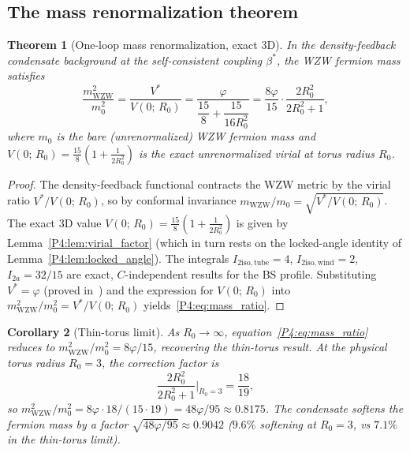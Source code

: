 \documentclass[11pt,a4paper]{article}
\newtheorem{theorem}{Theorem}[section]
\newtheorem{corollary}[theorem]{Corollary}
\theoremstyle{definition}
\theoremstyle{remark}
\newcommand{\vp}{\varphi}
\newcommand{\bst}{\beta^{*}}
\newcommand{\mWZW}{m_{\mathrm{WZW}}}
\begin{document}
\subsection{The mass renormalization theorem}

\begin{theorem}[One-loop mass renormalization, exact 3D]
\label{P4:thm:mass_renorm}
In the density-feedback condensate background at the self-consistent
coupling $\bst$, the WZW fermion mass satisfies
\begin{equation}
  \frac{\mWZW^2}{m_0^2}
  = \frac{V^*}{V(0;\,R_0)}
  = \frac{\vp}{\dfrac{15}{8}+\dfrac{15}{16R_0^2}}
  = \frac{8\vp}{15}\cdot\frac{2R_0^2}{2R_0^2+1},
  \label{P4:eq:mass_ratio}
\end{equation}
where $m_0$ is the bare (unrenormalized) WZW fermion mass and
$V(0;\,R_0) = \tfrac{15}{8}(1 + \tfrac{1}{2R_0^2})$
is the exact unrenormalized virial at torus radius $R_0$.
\end{theorem}

\begin{proof}
The density-feedback functional contracts the WZW metric by the virial ratio
$V^*/V(0;\,R_0)$, so by conformal invariance $\mWZW/m_0 = \sqrt{V^*/V(0;\,R_0)}$.
The exact 3D value $V(0;\,R_0) = \tfrac{15}{8}(1+\tfrac{1}{2R_0^2})$
is given by Lemma~\ref{P4:lem:virial_factor} (which in turn rests on the
locked-angle identity of Lemma~\ref{P4:lem:locked_angle}).
The integrals $I_{2\mathrm{iso,tube}}=4$, $I_{2\mathrm{iso,wind}}=2$, $I_{2a}=32/15$
are exact, $C$-independent results for the BS profile.
Substituting $V^*=\vp$ (proved in~\cite{Paper3}) and the expression
for $V(0;\,R_0)$ into $\mWZW^2/m_0^2 = V^*/V(0;\,R_0)$ yields~\eqref{P4:eq:mass_ratio}.
\end{proof}

\begin{corollary}[Thin-torus limit]
\label{P4:cor:thin_torus}
As $R_0\to\infty$, equation~\eqref{P4:eq:mass_ratio} reduces to
$\mWZW^2/m_0^2 = 8\vp/15$, recovering the thin-torus result.
At the physical torus radius $R_0=3$, the correction factor is
\[
  \frac{2R_0^2}{2R_0^2+1}\bigg|_{R_0=3}
  = \frac{18}{19},
\]
so $\mWZW^2/m_0^2 = 8\vp\cdot18/(15\cdot19) = 48\vp/95 \approx 0.8175$.
The condensate softens the fermion mass by a factor
$\sqrt{48\vp/95} \approx 0.9042$
($9.6\%$ softening at $R_0=3$, vs $7.1\%$ in the thin-torus limit).
\end{corollary}
\end{document}
